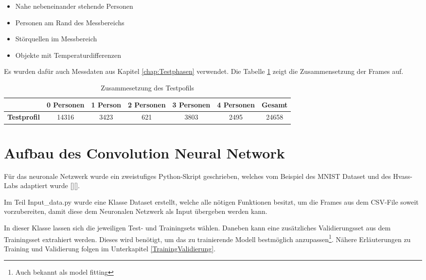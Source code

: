 \begin{itemize}
	\item Nahe nebeneinander stehende Personen 
	\item Personen am Rand des Messbereichs
	\item Störquellen im Messbereich
	\item Objekte mit Temperaturdifferenzen
\end{itemize}

Es wurden dafür auch Messdaten aus Kapitel \ref{chap:Testphasen} verwendet. Die Tabelle \ref{tab:Testprofil} zeigt die Zusammensetzung der Frames auf.

\begin{table}[H]
	\centering
	\caption{Zusammesetzung  des Testpofils}
	\label{tab:Testprofil}
	\begin{tabular}{|c|c|c|c|c|c|c|}
		\hline
		\rowcolor[HTML]{9B9B9B} 
		\multicolumn{1}{|l|}{\cellcolor[HTML]{9B9B9B}}                   & \multicolumn{1}{l|}{\cellcolor[HTML]{9B9B9B}\textbf{0 Personen}} & \textbf{1 Person} & \textbf{2 Personen} & \textbf{3 Personen} & \textbf{4 Personen} & \textbf{Gesamt} \\ \hline
		\cellcolor[HTML]{9B9B9B}\textbf{Testprofil}                         & 14316                                                          & 3423             & 621               & 3803                & 2495               & 24658          \\ \hline
	\end{tabular}
\end{table}

\section{Aufbau des Convolution Neural Network}
\label{AufbauConv}

Für das neuronale Netzwerk wurde ein zweistufiges Python-Skript geschrieben, welches vom Beispiel des \ac{MNIST Dataset} und des Hvass-Labs adaptiert wurde [\protect\cite{Tensorflow}][\protect\cite{HVASS}].

Im Teil Input\_data.py wurde eine Klasse Dataset erstellt, welche alle nötigen Funktionen besitzt, um die Frames aus dem \ac{CSV}-File soweit vorzubereiten, damit diese dem Neuronalen Netzwerk als Input übergeben werden kann. 

In dieser Klasse lassen sich die jeweiligen Test- und Trainingsets wählen. Daneben kann eine zusätzliches Validierungsset aus dem Trainingsset extrahiert werden. Dieses wird benötigt, um das zu trainierende Modell bestmöglich anzupassen\footnote{Auch  bekannt als model fitting}. Nähere Erläuterungen zu Training und Validierung folgen im Unterkapitel \ref{TrainingValidierung}.

